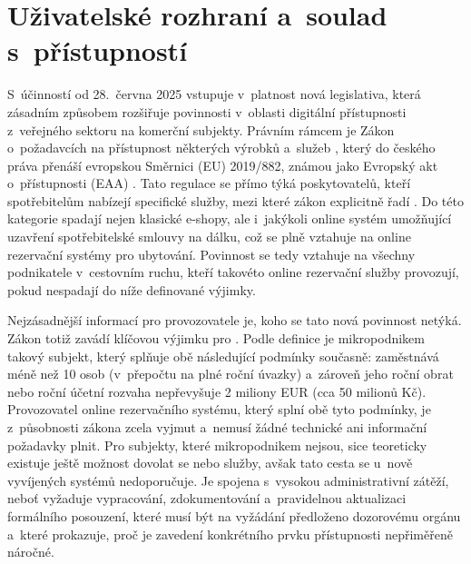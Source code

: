 \section{Uživatelské rozhraní a~soulad s~přístupností}
\label{sec:01-ui}
S~účinností od 28.~června 2025 vstupuje v~platnost nová legislativa, která zásadním způsobem rozšiřuje povinnosti v~oblasti digitální přístupnosti z~veřejného sektoru na komerční subjekty.
Právním rámcem je Zákon o~požadavcích na přístupnost některých výrobků a~služeb \cite{cz-2023-424}, který do českého práva přenáší evropskou Směrnici (EU) 2019/882, známou jako Evropský akt o~přístupnosti (EAA) \cite{eu-2019-882}.
Tato regulace se přímo týká poskytovatelů, kteří spotřebitelům nabízejí specifické služby, mezi které zákon explicitně řadí .
Do této kategorie spadají nejen klasické e-shopy, ale i~jakýkoli online systém umožňující uzavření spotřebitelské smlouvy na dálku, což se plně vztahuje na online rezervační systémy pro ubytování.
Povinnost se tedy vztahuje na všechny podnikatele v~cestovním ruchu, kteří takovéto online rezervační služby provozují, pokud nespadají do níže definované výjimky.   

Nejzásadnější informací pro provozovatele je, koho se tato nová povinnost netýká.
Zákon totiž zavádí klíčovou výjimku pro .
Podle definice je mikropodnikem takový subjekt, který splňuje obě následující podmínky současně: zaměstnává méně než 10 osob (v~přepočtu na plné roční úvazky) a~zároveň jeho roční obrat nebo roční účetní rozvaha nepřevyšuje 2 miliony EUR (cca 50 milionů Kč).
Provozovatel online rezervačního systému, který splní obě tyto podmínky, je z~působnosti zákona zcela vyjmut a~nemusí žádné technické ani informační požadavky plnit.
Pro subjekty, které mikropodnikem nejsou, sice teoreticky existuje ještě možnost dovolat se  nebo  služby, avšak tato cesta se u~nově vyvíjených systémů nedoporučuje.
Je spojena s~vysokou administrativní zátěží, neboť vyžaduje vypracování, zdokumentování a~pravidelnou aktualizaci formálního posouzení, které musí být na vyžádání předloženo dozorovému orgánu a~které prokazuje, proč je zavedení konkrétního prvku přístupnosti nepřiměřeně náročné.

